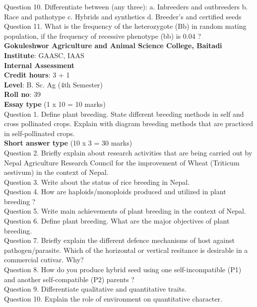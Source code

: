 \documentclass[12pt]{article}\usepackage[]{graphicx}\usepackage[]{color}
\begin{document}
Question 10. Differentiate between (any three): a. Inbreeders and outbreeders b. Race and pathotype c. Hybrids and synthetics d. Breeder's and certified seeds\\
Question 11. What is the frequency of the heterozygote (Bb) in random mating population, if the frequency of recessive phenotype (bb) is 0.04 ?\\
\clearpage 
{\centering \Large{\textbf{Gokuleshwor Agriculture and Animal Science College, Baitadi}} \\[0.25cm]
            \textbf{Institute}: GAASC, IAAS \\[0.2cm]
            \textbf{Internal Assessment} \\[0.2cm]} 
\textbf{Credit hours}: 3 + 1 \\ 
\textbf{Level}: B. Sc. Ag (4th Semester) \\
\textbf{Roll no}: 39 \\[0.5cm] 
\textbf{Essay type} (1 x 10 = 10 marks) \\
Question 1. Define plant breeding. State different breeding methods in self and cross pollinated crops. Explain with diagram breeding methods that are practiced in self-pollinated crops.\\
\textbf{Short answer type} (10 x 3 = 30 marks) \\
Question 2. Briefly explain about research activities that are being carried out by Nepal Agriculture Research Council for the improvement of Wheat (Triticum aestivum) in the context of Nepal.\\
Question 3. Write about the status of rice breeding in Nepal.\\
Question 4. How are haploids/monoploids produced and utilized in plant breeding ?\\
Question 5. Write main achievements of plant breeding in the context of Nepal.\\
Question 6. Define plant breeding. What are the major objectives of plant breeding.\\
Question 7. Briefly explain the different defence mechanisms of host against pathogen/parasite. Which of the horizontal or vertical resitance is desirable in a commercial cutivar. Why?\\
Question 8. How do you produce hybrid seed using one self-incompatible (P1) and another self-compatible (P2) parents ?\\
Question 9. Differentiate qualitative and quantitative traits.\\
Question 10. Explain the role of environment on quantitative character.\\
\end{document}
